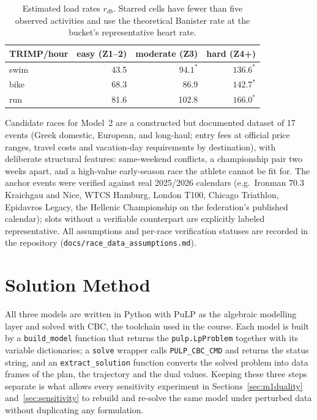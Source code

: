 \documentclass[11pt,a4paper]{article}
\begin{document}
\begin{table}[h]
\centering\small
\begin{tabular}{lrrr}
\toprule
TRIMP/hour & easy (Z1--2) & moderate (Z3) & hard (Z4+)\\
\midrule
swim & 43.5 & $94.1^{\ast}$ & $136.6^{\ast}$\\
bike & 68.3 & 86.9 & $142.7^{\ast}$\\
run  & 81.6 & 102.8 & $166.0^{\ast}$\\
\bottomrule
\end{tabular}
\caption{Estimated load rates $r_{db}$. Starred cells have fewer than five
observed activities and use the theoretical Banister rate at the bucket's
representative heart rate.}
\label{tab:rates}
\end{table}

Candidate races for Model~2 are a constructed but documented dataset of 17 events
(Greek domestic, European, and long-haul; entry fees at official price ranges,
travel costs and vacation-day requirements by destination), with deliberate
structural features: same-weekend conflicts, a championship pair two weeks apart,
and a high-value early-season race the athlete cannot be fit for. The anchor
events were verified against real 2025/2026 calendars (e.g.\ Ironman 70.3
Kraichgau and Nice, WTCS Hamburg, London T100, Chicago Triathlon, Epidavros
Legacy, the Hellenic Championship on the federation's published calendar);
slots without a verifiable counterpart are explicitly labeled representative.
All assumptions and per-race verification statuses are recorded in the
repository (\texttt{docs/race\_data\_assumptions.md}).

\section{Solution Method}
\label{sec:solution}

All three models are written in Python with PuLP as the algebraic modelling
layer and solved with CBC, the toolchain used in the course. Each model is
built by a \texttt{build\_model} function that returns the
\texttt{pulp.LpProblem} together with its variable dictionaries; a
\texttt{solve} wrapper calls \texttt{PULP\_CBC\_CMD} and returns the status
string, and an \texttt{extract\_solution} function converts the solved problem
into data frames of the plan, the trajectory and the dual values. Keeping these
three steps separate is what allows every sensitivity experiment in
Sections~\ref{sec:m1duality} and~\ref{sec:sensitivity} to rebuild and re-solve
the same model under perturbed data without duplicating any formulation.
\end{document}
